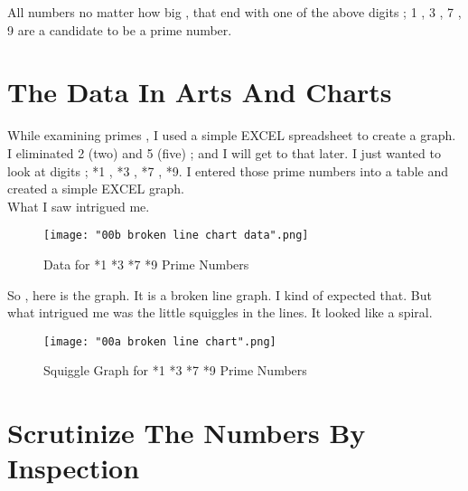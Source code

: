 \documentclass[12pt,letterpaper,oneside,titlepage]{article}
\begin{document}
All numbers no matter how big , that end with one of the above digits ; 1 , 3 , 7 , 9 are a candidate
to be a prime number. 


\pagebreak
\section{The Data In Arts And Charts}

\par
\tab While examining primes , I used a simple EXCEL spreadsheet to create a graph.
I eliminated 2 (two) and 5 (five) ; and I will get to that later. I just wanted to look at digits ; *1 , *3 , *7 , *9.
I entered those prime numbers into a table and created a simple EXCEL graph. 
\\What I saw intrigued me.

\begin{figure}[h]
	\centering
	\texttt{[image: "00b broken line chart data".png]}
	\caption{Data for *1 *3 *7 *9 Prime Numbers}
\end{figure}
\pagebreak



\par 
 So , here is the graph. It is a broken line graph. I kind of expected that.
But what intrigued me was the little squiggles in the lines. It looked like a spiral.

\begin{figure}[h]
	\centering
	\texttt{[image: "00a broken line chart".png]}
	\caption{Squiggle Graph for *1 *3 *7 *9 Prime Numbers}
\end{figure}
\pagebreak   



\section{Scrutinize The Numbers By Inspection}
\end{document}
